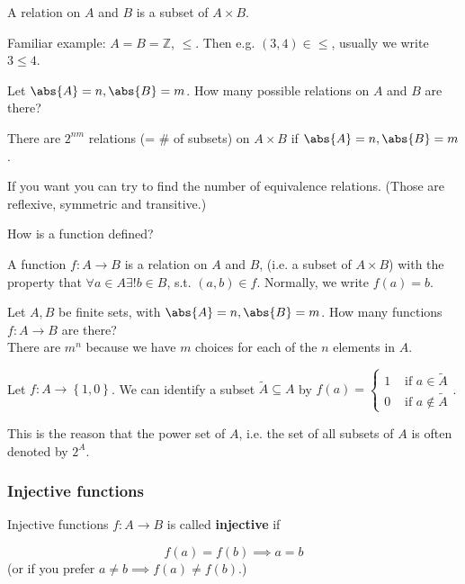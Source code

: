 \documentclass[english]{lbscript}
\begin{document}
\begin{definition}{}{}
  A relation on \(A\) and \(B\) is a subset of \(A×B\).
\end{definition}
\begin{example}{}{}
  Familiar example: \(A=B=ℤ\), \(≤\). Then e.g. \((3,4)∈≤\), usually we write \(3≤4\).
\end{example}

Let \(\abs{A}=n, \abs{B}=m\). How many possible relations on \(A\) and \(B\) are there?
\begin{proposition}{}{}
  There are \(2^{nm}\) relations (= \# of subsets) on \(A×B\) if \(\abs{A}=n, \abs{B}=m\).
\end{proposition}

If you want you can try to find the number of equivalence relations. (Those are reflexive, symmetric and transitive.)

How is a function defined?
\begin{definition}{}{}
  A function \(f:A→B\) is a relation on \(A\) and \(B\), (i.e. a subset of \(A×B\)) with the property that \(∀a∈A ∃! b∈B\), s.t. \((a,b)∈f\). Normally, we write \(f(a)=b\).
\end{definition}

\begin{proposition}{}{}
  Let \(A, B\) be finite sets, with \(\abs{A}=n, \abs{B}=m\). How many functions \(f:A→B\) are there?\\
  There are \(m^{n}\) because we have \(m\) choices for each of the \(n\) elements in \(A\).
\end{proposition}

\begin{remark}{}{}
  Let \(f: A → \left\{ 1, 0 \right\} \). We can identify a subset \(\tilde{A}⊆A\) by \(f(a) = \begin{cases} 1 & \text{ if } a∈\tilde{A} \\ 0 & \text{ if } a ∉ \tilde{A} \end{cases}\).

  This is the reason that the power set of \(A\), i.e. the set of all subsets of \(A\) is often denoted by \(2^{A}\).
\end{remark}

\subsubsection{Injective functions}
\label{sec:injective-functions}

\begin{definition}{Injective functions}{}
  \(f:A→B\) is called \textbf{injective} if

  \begin{equation}
    \label{eq:6}
    f(a)=f(b)⟹ a=b
  \end{equation}
  (or if you prefer \(a≠b⟹f(a)≠f(b)\).)
\end{definition}
\end{document}
